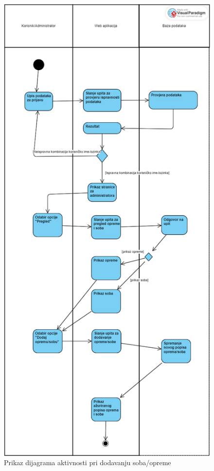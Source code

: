 			\begin{figure}[H]
				\includegraphics[scale=0.35]{slike/DijagramAktivnosti3.PNG} %
				\centering
				\caption{Prikaz dijagrama aktivnosti pri dodavanju soba/opreme}
				\label{fig:promjene}
			\end{figure}
			

